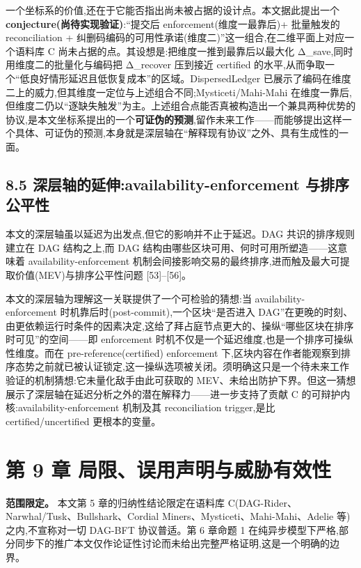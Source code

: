 \documentclass[UTF8,fontset=windows,a4paper,11pt]{ctexart}
\begin{document}
一个坐标系的价值,还在于它能否指出尚未被占据的设计点。本文据此提出一个
\textbf{conjecture(尚待实现验证)}:``提交后 enforcement(维度一最靠后)+
批量触发的 reconciliation +
纠删码编码的可用性承诺(维度二)''这一组合,在二维平面上对应一个语料库 C
尚未占据的点。其设想是:把维度一推到最靠后以最大化
Δ\_save,同时用维度二的批量化与编码把 Δ\_recover 压到接近 certified
的水平,从而争取一个``低良好情形延迟且低恢复成本''的区域。DispersedLedger
已展示了编码在维度二上的威力,但其维度一定位与上述组合不同;Mysticeti/Mahi-Mahi
在维度一靠后,但维度二仍以``逐缺失触发''为主。上述组合点能否真被构造出一个兼具两种优势的协议,是本文坐标系提出的一个\textbf{可证伪的预测},留作未来工作------而能够提出这样一个具体、可证伪的预测,本身就是深层轴在``解释现有协议''之外、具有生成性的一面。

\subsection{8.5 深层轴的延伸:availability-enforcement
与排序公平性}\label{ux6df1ux5c42ux8f74ux7684ux5ef6ux4f38availability-enforcement-ux4e0eux6392ux5e8fux516cux5e73ux6027}

本文的深层轴虽以延迟为出发点,但它的影响并不止于延迟。DAG
共识的排序规则建立在 DAG 结构之上,而 DAG
结构由哪些区块可用、何时可用所塑造------这意味着
availability-enforcement
机制会间接影响交易的最终排序,进而触及最大可提取价值(MEV)与排序公平性问题 {[}53{]}--{[}56{]}。

本文的深层轴为理解这一关联提供了一个可检验的猜想:当 availability-enforcement
时机靠后时(post-commit),一个区块``是否进入
DAG''在更晚的时刻、由更依赖运行时条件的因素决定,这给了拜占庭节点更大的、操纵``哪些区块在排序时可见''的空间------即 enforcement 时机不仅是一个延迟维度,也是一个排序可操纵性维度。而在 pre-reference(certified) enforcement 下,区块内容在作者能观察到排序态势之前就已被认证锁定,这一操纵选项被关闭。须明确这只是一个待未来工作验证的机制猜想:它未量化敌手由此可获取的 MEV、未给出防护下界。但这一猜想展示了深层轴在延迟分析之外的潜在解释力------进一步支持了贡献 C 的可辩护内核:availability-enforcement 机制及其 reconciliation trigger,是比 certified/uncertified 更根本的变量。

\section{第 9 章
局限、误用声明与威胁有效性}\label{ux7b2c-9-ux7ae0-ux5c40ux9650ux8befux7528ux58f0ux660eux4e0eux5a01ux80c1ux6709ux6548ux6027}

\textbf{范围限定。} 本文第 5 章的归纳性结论限定在语料库
C(DAG-Rider、Narwhal/Tusk、Bullshark、Cordial
Miners、Mysticeti、Mahi-Mahi、Adelie 等)之内,不宣称对一切 DAG-BFT
协议普适。第 6 章命题 1
在纯异步模型下严格,部分同步下的推广本文仅作论证性讨论而未给出完整严格证明,这是一个明确的边界。
\end{document}
